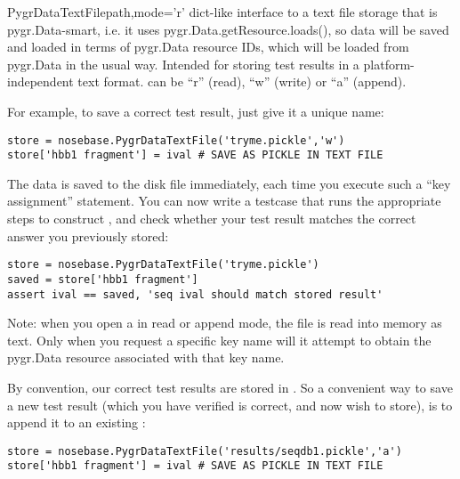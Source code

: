 \documentclass{howto}
\begin{document}
\begin{funcdesc}{PygrDataTextFile}{path,mode='r'}
  dict-like interface to a text file storage that is pygr.Data-smart,
  i.e. it uses pygr.Data.getResource.loads(), so data will be saved
  and loaded in terms of pygr.Data resource IDs, which will be loaded
  from pygr.Data in the usual way.  Intended for storing test results
  in a platform-independent text format.   can be ``r'' (read),
  ``w'' (write) or ``a'' (append).
  
  For example, to save a correct test result, just give it a unique
  name:
\begin{verbatim}
store = nosebase.PygrDataTextFile('tryme.pickle','w')
store['hbb1 fragment'] = ival # SAVE AS PICKLE IN TEXT FILE
\end{verbatim}
  The data is saved to the disk file immediately, each time you
  execute such a ``key assignment'' statement.
  You can now write a testcase that runs the appropriate steps to 
  construct , and check whether your test result matches the correct 
  answer you previously stored:
\begin{verbatim}
store = nosebase.PygrDataTextFile('tryme.pickle')
saved = store['hbb1 fragment']
assert ival == saved, 'seq ival should match stored result'
\end{verbatim}
  Note: when you open a  in read or append mode, the
  file is read into memory as text.  Only when you request a specific key name
  will it attempt to obtain the pygr.Data resource associated with that key name.

  By convention, our correct test results are stored in .
  So a convenient way to save a new test result (which you have verified is
  correct, and now wish to store), is to append it to an existing 
  :
\begin{verbatim}
store = nosebase.PygrDataTextFile('results/seqdb1.pickle','a')
store['hbb1 fragment'] = ival # SAVE AS PICKLE IN TEXT FILE
\end{verbatim}
\end{funcdesc}
\end{document}
